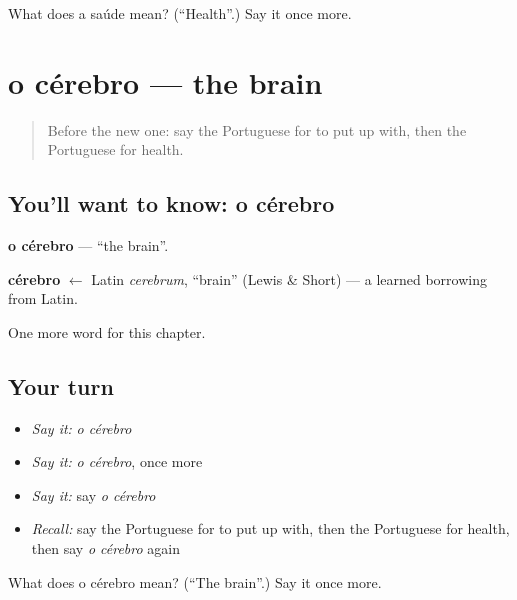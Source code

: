 \begin{tcolorbox}[breakable,colback=teal!4,colframe=teal!35!black,title={Before you move on}]
What does a saúde mean? (\textquotedblleft{}Health\textquotedblright{}.) Say it once more.
\end{tcolorbox}
\section[o cérebro]{o cérebro — the brain}

\label{lesson:PT-C148-cerebro}



\begin{quote}
Before the new one: say the Portuguese for to put up with, then the Portuguese for health.
\end{quote}

\subsection*{You'll want to know: o cérebro}
\textbf{o cérebro} — \textquotedblleft{}the brain\textquotedblright{}.

\begin{cousinweb}
\textbf{cérebro} $\leftarrow$ Latin \emph{cerebrum}, \textquotedblleft{}brain\textquotedblright{} (Lewis \& Short) — a learned borrowing from Latin.
\end{cousinweb}

\begin{grammarlens}[title={What you've built}]
One more word for this chapter.
\end{grammarlens}

\subsection*{Your turn}
\begin{itemize}
\raggedright
  \item \emph{Say it:} \emph{o cérebro}
  \item \emph{Say it:} \emph{o cérebro}, once more
  \item \emph{Say it:} say \emph{o cérebro}
  \item \emph{Recall:} say the Portuguese for to put up with, then the Portuguese for health, then say \emph{o cérebro} again
\end{itemize}

\begin{tcolorbox}[breakable,colback=teal!4,colframe=teal!35!black,title={Before you move on}]
What does o cérebro mean? (\textquotedblleft{}The brain\textquotedblright{}.) Say it once more.
\end{tcolorbox}
